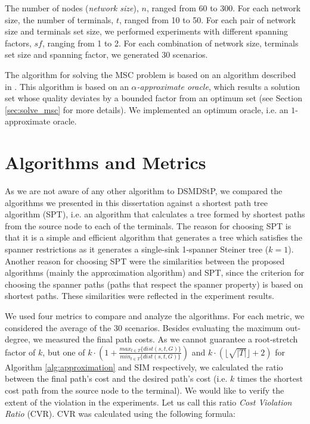 The number of nodes (\emph{network size}), $n$, ranged from 60 to 300. For each network size, the number of terminals, $t$, ranged from 10 to 50. 
For each pair of network size and terminals set size,
we performed experiments with different spanning factors, $sf$, ranging from 1 to 2. 
For each combination of network size, terminals set size and spanning factor,
we generated 30 scenarios. 

The algorithm for solving the MSC problem is based on an algorithm described in \cite{Chekuri2004}. This algorithm is based
on an \emph{$\alpha$-approximate oracle}, which results a solution set whose quality deviates by a bounded factor from an optimum set (see Section \ref{sec:solve_msc} for more details). 
We implemented an optimum oracle, i.e. an $1$-approximate oracle.


\section{Algorithms and Metrics}
\label{sec:metrics}
As we are not aware of any other algorithm to \mbox{DSMDStP}, we compared the algorithms we presented in this dissertation 
against a shortest path tree algorithm (SPT), i.e. an algorithm that calculates a tree formed by shortest paths from the source node to each
of the terminals. The reason for choosing SPT is that it is a simple and efficient algorithm that generates a tree which satisfies the
spanner restrictions as it generates a single-sink 1-spanner Steiner tree ($k=1$). 
Another reason for choosing SPT were the similarities between the proposed algorithms (mainly the approximation algorithm) 
and SPT, since the criterion for choosing the spanner paths (paths that respect the spanner property) is based on shortest paths. These similarities were 
reflected in the experiment results.

We used four metrics to compare and analyze the algorithms. For each metric, we considered the average of the 30 scenarios. Besides evaluating the maximum out-degree, 
we measured the final path costs. As we cannot guarantee a root-stretch factor of $k$, but one of $k \cdot \left(1 + \frac{max_{t\in T}\{dist(s,t,G)\}}{min_{t \in T}\{dist(s,t,G)\}}\right)$ and $k \cdot (\lfloor\sqrt{|T|}\rfloor + 2)$ 
for Algorithm \ref{alg:approximation} and SIM respectively, we calculated the ratio between the final path's cost and the desired path's cost 
(i.e. $k$ times the shortest cost path from the source node to the terminal). We would like to verify the extent of the violation in the experiments. 
Let us 
call this ratio \emph{Cost Violation Ratio} (CVR). 
CVR was calculated using the following formula:

